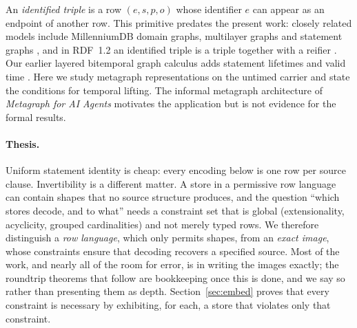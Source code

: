 \documentclass[11pt]{article}
\theoremstyle{plain}
\theoremstyle{definition}
\theoremstyle{remark}
\begin{document}
An \emph{identified triple} is a row $(e,s,p,o)$ whose identifier $e$ can appear as an
endpoint of another row. This primitive predates the present work: closely related
models include MillenniumDB domain graphs, multilayer graphs and statement graphs
\cite{vrgoc2023millenniumdb,angles2022multilayer,gelling2024statement}, and in RDF~1.2
an identified triple is a triple together with a reifier
\cite{w3c2026rdf12concepts}. Our earlier layered bitemporal graph calculus adds
statement lifetimes and valid time \cite{pavlyshyn2026lbg}. Here we study metagraph
representations on the untimed carrier and state the conditions for temporal lifting.
The informal metagraph architecture of \emph{Metagraph for AI Agents}
\cite{pavlyshyn2026metagraph} motivates the application but is not evidence for the
formal results.

\paragraph{Thesis.}
Uniform statement identity is cheap: every encoding below is one row per source clause.
Invertibility is a different matter. A store in a permissive row language can contain
shapes that no source structure produces, and the question ``which stores decode, and
to what'' needs a constraint set that is global (extensionality, acyclicity, grouped
cardinalities) and not merely typed rows. We therefore distinguish a \emph{row
language}, which only permits shapes, from an \emph{exact image}, whose constraints
ensure that decoding recovers a specified source. Most of the work, and nearly all
of the room for error, is in writing the images exactly; the roundtrip theorems that
follow are bookkeeping once this is done, and we say so rather than presenting
them as depth. Section~\ref{sec:embed} proves that every constraint is necessary
by exhibiting, for each, a store that violates only that constraint.
\end{document}
